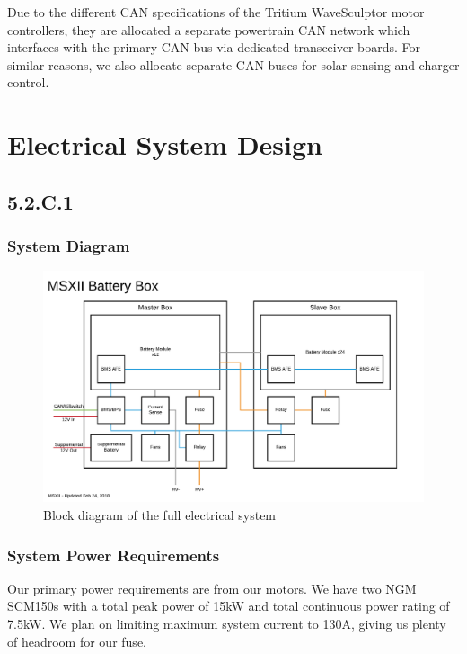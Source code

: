 \documentclass[10pt]{article}
\begin{document}
Due to the different CAN specifications of the Tritium WaveSculptor motor controllers, they are allocated a separate powertrain CAN network which interfaces with the primary CAN bus via dedicated transceiver boards. For similar reasons, we also allocate separate CAN buses for solar sensing and charger control.

\section{Electrical System Design}

\subsection{5.2.C.1}

\subsubsection{System Diagram}

\begin{figure}[H]
    \centering
    \includegraphics[width=\textwidth,page=3]{figures/msxii-block-diagrams}
    \caption{Block diagram of the full electrical system}
    \label{fig:msxii-electrical-full-block-diagram}
\end{figure}

\subsubsection{System Power Requirements}

Our primary power requirements are from our motors. We have two NGM SCM150s with a total peak power of 15kW and total continuous power rating of 7.5kW. We plan on limiting maximum system current to 130A, giving us plenty of headroom for our fuse.
\end{document}
